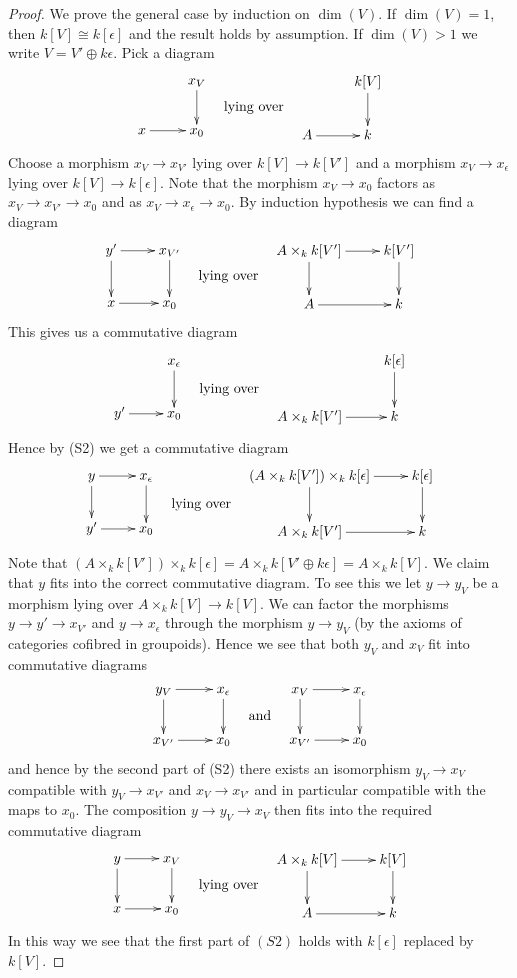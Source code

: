 \begin{proof}
\medskip\noindent
We prove the general case by induction on $\dim(V)$. If $\dim(V) = 1$, then
$k[V] \cong k[\epsilon]$ and the result holds by assumption.
If $\dim(V) > 1$ we write $V = V' \oplus k\epsilon$. Pick a diagram
$$
\vcenter{
\xymatrix{
& x_V \ar[d] \\
x \ar[r] & x_0
}
}
\quad\text{lying over}\quad
\vcenter{
\xymatrix{
& k[V] \ar[d] \\
A \ar[r] & k
}
}
$$
Choose a morphism $x_V \to x_{V'}$ lying over $k[V] \to k[V']$
and a morphism $x_V \to x_\epsilon$ lying over $k[V] \to k[\epsilon]$.
Note that the morphism $x_V \to x_0$ factors as
$x_V \to x_{V'} \to x_0$ and as $x_V \to x_\epsilon \to x_0$.
By induction hypothesis we can find a diagram
$$
\vcenter{
\xymatrix{
y' \ar[d] \ar[r] & x_{V'} \ar[d] \\
x \ar[r] & x_0
}
}
\quad\text{lying over}\quad
\vcenter{
\xymatrix{
A \times_k k[V'] \ar[d] \ar[r] & k[V'] \ar[d] \\
A \ar[r] & k
}
}
$$
This gives us a commutative diagram
$$
\vcenter{
\xymatrix{
& x_\epsilon \ar[d] \\
y' \ar[r] & x_0
}
}
\quad\text{lying over}\quad
\vcenter{
\xymatrix{
& k[\epsilon] \ar[d] \\
A \times_k k[V'] \ar[r] & k
}
}
$$
Hence by (S2) we get a commutative diagram
$$
\vcenter{
\xymatrix{
y \ar[d] \ar[r] & x_\epsilon \ar[d] \\
y' \ar[r] & x_0
}
}
\quad\text{lying over}\quad
\vcenter{
\xymatrix{
(A \times_k k[V']) \times_k k[\epsilon] \ar[d] \ar[r] & k[\epsilon] \ar[d] \\
A \times_k k[V'] \ar[r] & k
}
}
$$
Note that
$(A \times_k k[V']) \times_k k[\epsilon] = A \times_k k[V' \oplus k\epsilon]
= A \times_k k[V]$. We claim that $y$ fits into the correct commutative
diagram. To see this we let $y \to y_V$ be a morphism lying over
$A \times_k k[V] \to k[V]$. We can factor the morphisms
$y \to y' \to x_{V'}$ and $y \to x_\epsilon$ through the morphism
$y \to y_V$ (by the axioms of categories cofibred in groupoids).
Hence we see that both $y_V$ and $x_V$ fit into commutative diagrams
$$
\vcenter{
\xymatrix{
y_V \ar[r] \ar[d] & x_\epsilon \ar[d] \\
x_{V'} \ar[r]          & x_0
}
}
\quad\text{and}\quad
\vcenter{
\xymatrix{
x_V \ar[r] \ar[d] & x_\epsilon \ar[d] \\
x_{V'} \ar[r]                 & x_0
}
}
$$
and hence by the second part of (S2) there exists an isomorphism
$y_V \to x_V$ compatible with $y_V \to x_{V'}$ and $x_V \to x_{V'}$
and in particular compatible with the maps to $x_0$.
The composition $y \to y_V \to x_V$ then fits into the required commutative
diagram
$$
\vcenter{
\xymatrix{
y \ar[r] \ar[d] & x_V \ar[d] \\
x \ar[r] & x_0
}
}
\quad\text{lying over}\quad
\vcenter{
\xymatrix{
A \times_k k[V] \ar[d] \ar[r] & k[V] \ar[d] \\
A \ar[r] & k
}
}
$$
In this way we see that the first part of $(S2)$ holds with $k[\epsilon]$
replaced by $k[V]$.


\end{proof}
